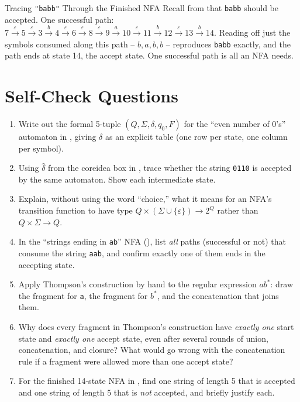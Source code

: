 \documentclass[full-course-notes.tex]{subfiles}
\begin{document}
\begin{examplebox}{Tracing \texttt{"babb"} Through the Finished NFA}
Recall from  that \texttt{babb} should be accepted. One
successful path: $7 \xrightarrow{\varepsilon} 5 \xrightarrow{\varepsilon} 3 \xrightarrow{b} 4
\xrightarrow{\varepsilon} 6 \xrightarrow{\varepsilon} 8 \xrightarrow{\varepsilon} 9
\xrightarrow{a} 10 \xrightarrow{\varepsilon} 11 \xrightarrow{b} 12 \xrightarrow{\varepsilon} 13
\xrightarrow{b} 14$. Reading off just the symbols consumed along this path --
$b, a, b, b$ -- reproduces \texttt{babb} exactly, and the path ends at state 14, the accept
state. One successful path is all an NFA needs.
\end{examplebox}

\section{Self-Check Questions}
\label{sec:l5-selfcheck}

\begin{enrichment}
\begin{enumerate}
  \item Write out the formal 5-tuple $(Q, \Sigma, \delta, q_0, F)$ for the ``even number of
  0's'' automaton in , giving $\delta$ as an explicit table (one row per
  state, one column per symbol).
  \item Using $\hat\delta$ from the coreidea box in , trace whether the
  string \texttt{0110} is accepted by the same automaton. Show each intermediate state.
  \item Explain, without using the word ``choice,'' what it means for an NFA's transition
  function to have type $Q \times (\Sigma \cup \{\varepsilon\}) \to 2^{Q}$ rather than
  $Q \times \Sigma \to Q$.
  \item In the ``strings ending in \texttt{ab}'' NFA (), list \emph{all}
  paths (successful or not) that consume the string \texttt{aab}, and confirm exactly one of
  them ends in the accepting state.
  \item Apply Thompson's construction by hand to the regular expression $ab^{*}$: draw the
  fragment for \texttt{a}, the fragment for $b^{*}$, and the concatenation that joins them.
  \item Why does every fragment in Thompson's construction have \emph{exactly one} start state
  and \emph{exactly one} accept state, even after several rounds of union, concatenation, and
  closure? What would go wrong with the concatenation rule if a fragment were allowed more than
  one accept state?
  \item For the finished 14-state NFA in , find one string of
  length 5 that is accepted and one string of length 5 that is \emph{not} accepted, and briefly
  justify each.
\end{enumerate}
\end{enrichment}
\end{document}
